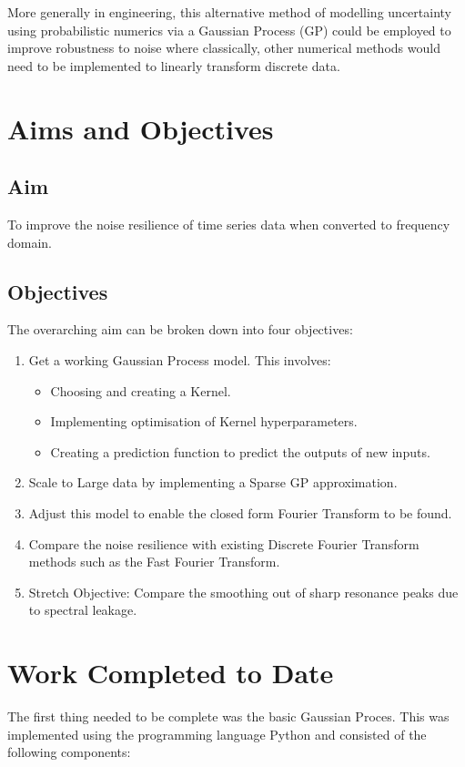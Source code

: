 \documentclass[12pt]{article}
\begin{document}
    More generally in engineering, this alternative method of modelling uncertainty using probabilistic numerics via a Gaussian Process (GP) could be employed to improve robustness to noise where classically, other numerical methods would need to be implemented to linearly transform discrete data.


    \section{Aims and Objectives}
    \subsection{Aim}
    To improve the noise resilience of time series data when converted to frequency domain.

    \subsection{Objectives}
    The overarching aim can be broken down into four objectives:
        \begin{enumerate}
            \item Get a working Gaussian Process model.
            This involves:
                \begin{itemize}
                    \item Choosing and creating a Kernel.
                    \item Implementing optimisation of Kernel hyperparameters. \label{item:nll}
                    \item Creating a prediction function to predict the outputs of new inputs. \label{item:predict}
                \end{itemize}
            \item Scale to Large data by implementing a Sparse GP approximation.
            \item Adjust this model to enable the closed form Fourier Transform to be found.
            \item Compare the noise resilience with existing Discrete Fourier Transform methods such as the Fast Fourier Transform.\label{noise-resiliance}
            \item Stretch Objective: Compare the smoothing out of sharp resonance peaks due to spectral leakage.\label{stretch-obj}
        \end{enumerate}

    \section{Work Completed to Date}
    The first thing needed to be complete was the basic Gaussian Proces.
    This was implemented using the programming language Python and consisted of the following components:
\end{document}
